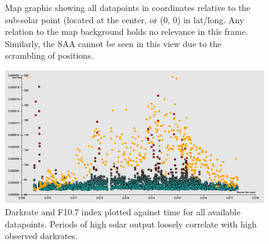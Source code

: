 \documentclass[a4paper,11pt]{article}
\begin{document}
\begin{figure}[!tbp]
\begin{minipage}[b]{0.4\textwidth}
    \caption{Map graphic showing all datapoints in coordinates relative to the sub-solar point (located at the center, or
    (0, 0) in lat/long.  Any relation to the map background holds no relevance in this frame.  Similarly, the SAA cannot 
    be seen in this view due to the scrambling of positions.  }
  \end{minipage}
\end{figure}

\begin{figure}[h!]
\caption{Darkrate and F10.7 index plotted against time for all available datapoints.  Periods of high solar output 
 loosely correlate with high observed darkrates.}
\centering
\includegraphics[width=.6\textwidth]{dark-time.png}
\end{figure}
\end{document}
